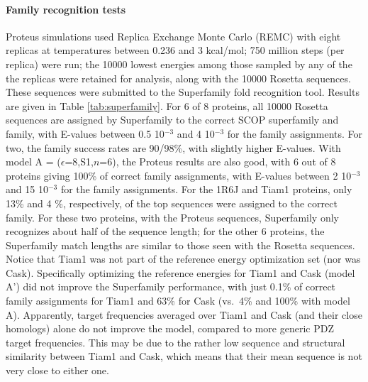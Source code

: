 \documentclass[12pt]{article}
\begin{document}
\paragraph{Family recognition tests}
Proteus simulations used Replica Exchange Monte Carlo (REMC) with eight replicas at temperatures between 0.236 and 3 kcal/mol;
750 million steps (per replica) were run; the 10000 lowest energies among those sampled by any of the the replicas were retained
for analysis, along with the 10000 Rosetta sequences. These sequences were submitted to the Superfamily fold recognition tool.
Results are given in Table \ref{tab:superfamily}. For 6 of 8 proteins, all 10000 Rosetta sequences are assigned by Superfamily
to the correct SCOP superfamily and family, with E-values between 0.5 10$^{-3}$ and 4 10$^{-3}$ for the family assignments. For
two, the family success rates are 90/98\%, with slightly higher E-values. With model A = ($\epsilon$=8,S1,$n$=6), the Proteus
results are also good, with 6 out of 8 proteins giving 100\% of correct family assignments, with E-values between 2 10$^{-3}$
and 15 10$^{-3}$ for the family assignments. For the 1R6J and Tiam1 proteins, only 13\% and 4 \%, respectively, of the top sequences
were assigned to the correct family. For these two proteins, with the Proteus sequences, Superfamily only recognizes about half
of the sequence length; for the other 6 proteins, the Superfamily match lengths are similar to those seen with the Rosetta sequences.
Notice that Tiam1 was not part of the reference energy optimization set (nor was Cask). Specifically optimizing the reference
energies for Tiam1 and Cask (model A') did not improve the Superfamily performance, with just 0.1\% of correct family assignments
for Tiam1 and 63\% for Cask (vs.\ 4\% and 100\% with model A). Apparently, target frequencies averaged over Tiam1 and Cask 
(and their close homologs) alone do not improve the model, compared to more generic PDZ target frequencies. This may be due to
the rather low sequence and structural similarity between Tiam1 and Cask, which means that their mean sequence is not very close
to either one.
\end{document}
